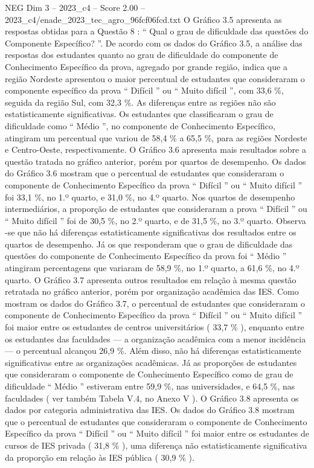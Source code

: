 \begin{textsample}{NEG Dim 3 – 2023\_c4 – Score 2.00 – 2023\_c4/enade\_2023\_tec\_agro\_96fcf06fcd.txt}
O Gráfico 3.5 apresenta as respostas obtidas para a Questão 8 : “ Qual o grau de dificuldade das questões do Componente Específico? ”.
De acordo com os dados do Gráfico 3.5, a análise das respostas dos estudantes quanto ao grau de dificuldade do componente de Conhecimento Específico da prova, agregado por grande região, indica que a região Nordeste apresentou o maior percentual de estudantes que consideraram o componente específico da prova “ Difícil ” ou “ Muito difícil ”, com 33,6 \%, seguida da região Sul, com 32,3 \%.
As diferenças entre as regiões não são estatisticamente significativas.
Os estudantes que classificaram o grau de dificuldade como “ Médio ”, no componente de Conhecimento Específico, atingiram um percentual que variou de 58,4 \% a 65,5 \%, para as regiões Nordeste e Centro-Oeste, respectivamente.
O Gráfico 3.6 apresenta mais resultados sobre a questão tratada no gráfico anterior, porém por quartos de desempenho.
Os dados do Gráfico 3.6 mostram que o percentual de estudantes que consideraram o componente de Conhecimento Específico da prova “ Difícil ” ou “ Muito difícil ” foi 33,1 \%, no 1.º quarto, e 31,0 \%, no 4.º quarto.
Nos quartos de desempenho intermediários, a proporção de estudantes que consideraram a prova “ Difícil ” ou “ Muito difícil ” foi de 30,5 \%, no 2.º quarto, e de 31,5 \%, no 3.º quarto.
Observa -se que não há diferenças estatisticamente significativas dos resultados entre os quartos de desempenho.
Já os que responderam que o grau de dificuldade das questões do componente de Conhecimento Específico da prova foi “ Médio ” atingiram percentagens que variaram de 58,9 \%, no 1.º quarto, a 61,6 \%, no 4.º quarto.
O Gráfico 3.7 apresenta outros resultados em relação à mesma questão retratada no gráfico anterior, porém por organização acadêmica das IES.
Como mostram os dados do Gráfico 3.7, o percentual de estudantes que consideraram o componente de Conhecimento Específico da prova “ Difícil ” ou “ Muito difícil ” foi maior entre os estudantes de centros universitários ( 33,7 \% ), enquanto entre os estudantes das faculdades — a organização acadêmica com a menor incidência — o percentual alcançou 26,9 \%.
Além disso, não há diferenças estatisticamente significativas entre as organizações acadêmicas.
Já as proporções de estudantes que consideraram o componente de Conhecimento Específico como de grau de dificuldade “ Médio ” estiveram entre 59,9 \%, nas universidades, e 64,5 \%, nas faculdades ( ver também Tabela V.4, no Anexo V ).
O Gráfico 3.8 apresenta os dados por categoria administrativa das IES.
Os dados do Gráfico 3.8 mostram que o percentual de estudantes que consideraram o componente de Conhecimento Específico da prova “ Difícil ” ou “ Muito difícil ” foi maior entre os estudantes de cursos de IES privada ( 31,8 \% ), uma diferença não estatisticamente significativa da proporção em relação às IES pública ( 30,9 \% ).

\end{textsample}
